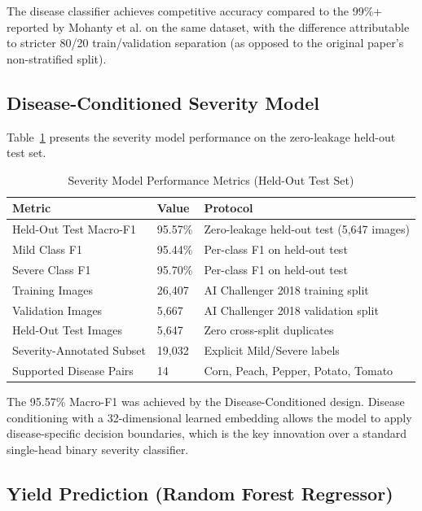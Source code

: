 The disease classifier achieves competitive accuracy compared to the 99\%+ reported by Mohanty et al. on the same dataset, with the difference attributable to stricter 80/20 train/validation separation (as opposed to the original paper's non-stratified split).

\subsection{Disease-Conditioned Severity Model}

Table~\ref{tab:severity_perf} presents the severity model performance on the zero-leakage held-out test set.

\begin{table}[H]
\centering
\caption{Severity Model Performance Metrics (Held-Out Test Set)}
\label{tab:severity_perf}
\begin{tabular}{|p{4.2cm}|p{2.6cm}|p{5.5cm}|}
\hline
\textbf{Metric} & \textbf{Value} & \textbf{Protocol} \\
\hline
Held-Out Test Macro-F1 & 95.57\% & Zero-leakage held-out test (5,647 images) \\
Mild Class F1 & 95.44\% & Per-class F1 on held-out test \\
Severe Class F1 & 95.70\% & Per-class F1 on held-out test \\
Training Images & 26,407 & AI Challenger 2018 training split \\
Validation Images & 5,667 & AI Challenger 2018 validation split \\
Held-Out Test Images & 5,647 & Zero cross-split duplicates \\
Severity-Annotated Subset & 19,032 & Explicit Mild/Severe labels \\
Supported Disease Pairs & 14 & Corn, Peach, Pepper, Potato, Tomato \\
\hline
\end{tabular}
\end{table}

The 95.57\% Macro-F1 was achieved by the Disease-Conditioned design. Disease conditioning with a 32-dimensional learned embedding allows the model to apply disease-specific decision boundaries, which is the key innovation over a standard single-head binary severity classifier.

\subsection{Yield Prediction (Random Forest Regressor)}


